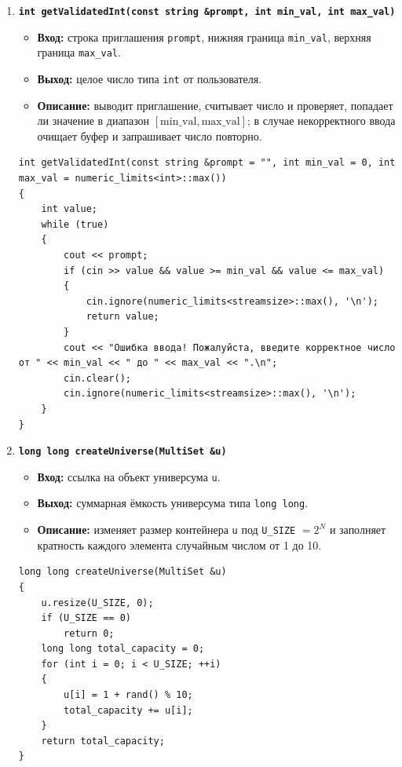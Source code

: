 \documentclass[14pt, a4paper]{extarticle}
\begin{document}
\begin{enumerate}[label=\arabic*., resume]
		\item \textbf{\texttt{int getValidatedInt(const string \&prompt, int min\_val, int max\_val)}}
		\begin{itemize}[leftmargin=*, noitemsep]
			\item \textbf{Вход:} строка приглашения \texttt{prompt}, нижняя граница \texttt{min\_val}, верхняя граница \texttt{max\_val}.
			\item \textbf{Выход:} целое число типа \texttt{int} от пользователя.
			\item \textbf{Описание:} выводит приглашение, считывает число и проверяет, попадает ли значение в диапазон $[\text{min\_val}, \text{max\_val}]$; в случае некорректного ввода очищает буфер и запрашивает число повторно.
		\end{itemize}
		\begin{lstlisting}[caption={Функция getValidatedInt()}, label={lst:func_get_validated_int}]
int getValidatedInt(const string &prompt = "", int min_val = 0, int max_val = numeric_limits<int>::max())
{
    int value;
    while (true)
    {
        cout << prompt;
        if (cin >> value && value >= min_val && value <= max_val)
        {
            cin.ignore(numeric_limits<streamsize>::max(), '\n');
            return value;
        }
        cout << "Ошибка ввода! Пожалуйста, введите корректное число от " << min_val << " до " << max_val << ".\n";
        cin.clear();
        cin.ignore(numeric_limits<streamsize>::max(), '\n');
    }
}
		\end{lstlisting}
		
		\item \textbf{\texttt{long long createUniverse(MultiSet \&u)}}
		\begin{itemize}[leftmargin=*, noitemsep]
			\item \textbf{Вход:} ссылка на объект универсума \texttt{u}.
			\item \textbf{Выход:} суммарная ёмкость универсума типа \texttt{long long}.
			\item \textbf{Описание:} изменяет размер контейнера \texttt{u} под \texttt{U\_SIZE} $=2^N$ и заполняет кратность каждого элемента случайным числом от 1 до 10.
		\end{itemize}
		\begin{lstlisting}[caption={Функция createUniverse()}, label={lst:func_create_universe}]
long long createUniverse(MultiSet &u)
{
    u.resize(U_SIZE, 0);
    if (U_SIZE == 0)
        return 0;
    long long total_capacity = 0;
    for (int i = 0; i < U_SIZE; ++i)
    {
        u[i] = 1 + rand() % 10;
        total_capacity += u[i];
    }
    return total_capacity;
}
		\end{lstlisting}
	\end{enumerate}
	
\end{document}
